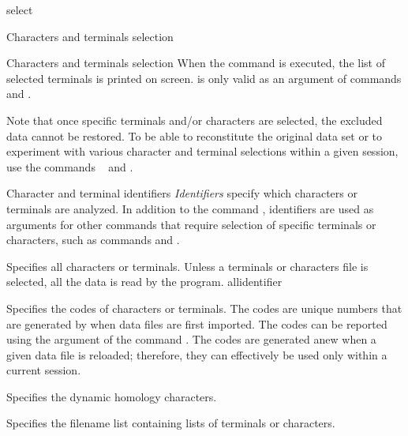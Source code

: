 \begin{command}{select}{}
\begin{arguments}
\begin{argumentgroup}{Characters and terminals selection}
\begin{arguments}
\begin{argumentgroup}{Characters and terminals selection}
{                When the command is executed, the list of selected terminals is
                printed on screen.   is only valid as an
                argument of commands  and .} 
                {}
    
            \begin{statement}
                  Note that once specific terminals and/or  characters are selected, the excluded
                data cannot be restored. To be able to reconstitute the original data set or to
                experiment with various character and terminal selections within a given \poy
                session, use the commands ~ and .
            \end{statement}
    
        \end{argumentgroup}
        
        \begin{argumentgroup}{Character and terminal identifiers}\label{identifiers}
            {\emph{Identifiers} specify which characters or terminals are analyzed.
            In addition to the command , identifiers are used as
            arguments for other commands that require selection of specific terminals or
            characters, such as commands  and
            .}

                {Specifies all characters or terminals.  Unless a terminals or characters file
                is selected, all the data is read by the program.}
                {allidentifier}

                {Specifies the codes of characters or terminals. The codes are unique
                numbers that are generated by \poy when data files are first imported.
                The codes can be reported using the argument 
                of the command . The codes are generated anew
                when a given data file is reloaded; therefore, they can effectively be used
                only within a current \poy session.}
                {}

                {Specifies the dynamic homology characters.}
                {}

                {Specifies the filename list containing lists of terminals or
                characters.}
                {}


\end{argumentgroup}
\end{arguments}
\end{argumentgroup}
\end{arguments}
\end{command}
